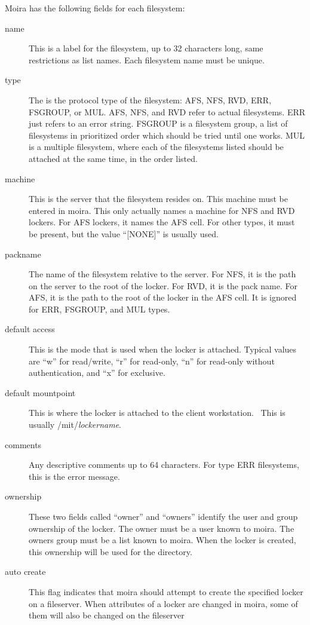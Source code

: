 Moira has the following fields for each filesystem:
\begin{description}
\item[name] This is a label for the filesystem, up to 32 characters long,
same restrictions as list names.  Each filesystem name must be unique.
\item[type] The is the protocol type of the filesystem: AFS, NFS, RVD, ERR,
FSGROUP, or MUL.  AFS, NFS, and RVD refer to actual filesystems.  ERR
just refers to an error string.  FSGROUP is a filesystem group, a list
of filesystems in prioritized order which should be tried until one
works.  MUL is a multiple filesystem, where each of the filesystems
listed should be attached at the same time, in the order listed.
\item[machine] This is the server that the filesystem resides on.  This
machine must be entered in moira.  This only actually names a machine
for NFS and RVD lockers.  For AFS lockers, it names the AFS cell.  For
other types, it must be present, but the value ``[NONE]'' is usually used.
\item[packname] The name of the filesystem relative to the server.  For NFS,
it is the path on the server to the root of the locker.  For RVD, it
is the pack name.  For AFS, it is the path to the root of the locker
in the AFS cell.  It is ignored for ERR, FSGROUP, and MUL types.
\item[default access] This is the mode that is used when the locker is
attached.  Typical values are ``w'' for read/write, ``r'' for read-only,
``n'' for read-only without authentication, and ``x'' for exclusive.
\item[default mountpoint] This is where the locker is attached to the client
workstation.  \athena\ This is usually /mit/{\em lockername}.
\item[comments] Any descriptive comments up to 64 characters.  For type ERR
filesystems, this is the error message.
\item[ownership] These two fields called ``owner'' and ``owners'' identify
the user and group ownership of the locker.  The owner must be a user
known to moira.  The owners group must be a list known to moira.  When
the locker is created, this ownership will be used for the directory.
\item[auto create] This flag indicates that moira should attempt to create
the specified locker on a fileserver.  When attributes of a locker are
changed in moira, some of them will also be changed on the fileserver

\end{description}
